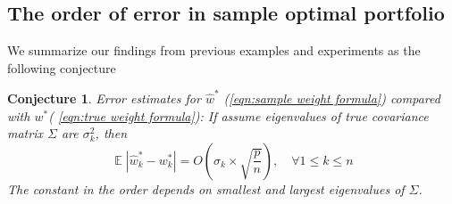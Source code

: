 \documentclass[12pt]{extarticle}
\newtheorem{conjecture}[theorem]{Conjecture}
\newcommand{\1}{\mathbbm{1}}
\DeclareMathOperator{\E}{\mathbb{E}}
\numberwithin{equation}{section}
\begin{document}
\subsection{The order of error in sample optimal portfolio}
We summarize our findings from previous examples and experiments as the following conjecture 
\begin{conjecture}
Error estimates for $\hat{w}^*$ (\ref{eqn:sample weight formula}) compared with $w^*$( \ref{eqn:true weight formula}): If assume eigenvalues of true covariance matrix $\Sigma$ are $\sigma_k^2$, then
\begin{equation*}
   \E| \hat{w}^*_k - w^*_k| = O\left( \sigma_k \times \sqrt{\frac{p}{n}} \right),\quad  \forall 1\le k \le n
\end{equation*}
The constant in the order depends on smallest and largest eigenvalues of $\Sigma$.
\end{conjecture}
\end{document}
